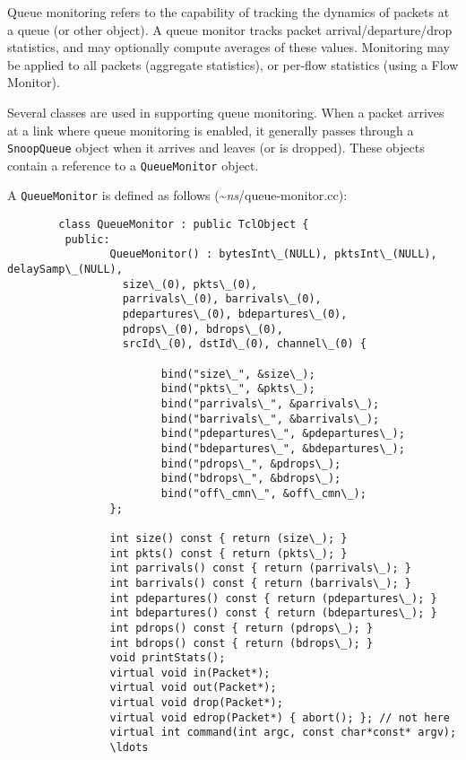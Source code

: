 Queue monitoring refers to the capability of tracking the
dynamics of packets at a queue (or other object).
A queue monitor tracks packet arrival/departure/drop statistics,
and may optionally compute averages of these values.
Monitoring may be applied to all packets (aggregate statistics), or
per-flow statistics (using a Flow Monitor).

Several classes are used in supporting queue monitoring.
When a packet arrives at a link where queue monitoring is enabled,
it generally passes through a {\tt SnoopQueue} object when it
arrives and leaves (or is dropped).
These objects contain a reference to a {\tt QueueMonitor} object.

A {\tt QueueMonitor} is defined as follows (\textasciitilde\emph{ns}/{queue-monitor.cc}):
\begin{verbatim}
        class QueueMonitor : public TclObject {
         public: 
                QueueMonitor() : bytesInt\_(NULL), pktsInt\_(NULL), delaySamp\_(NULL),
                  size\_(0), pkts\_(0),
                  parrivals\_(0), barrivals\_(0),
                  pdepartures\_(0), bdepartures\_(0),
                  pdrops\_(0), bdrops\_(0),
                  srcId\_(0), dstId\_(0), channel\_(0) {

                        bind("size\_", &size\_);
                        bind("pkts\_", &pkts\_);
                        bind("parrivals\_", &parrivals\_);
                        bind("barrivals\_", &barrivals\_);
                        bind("pdepartures\_", &pdepartures\_);
                        bind("bdepartures\_", &bdepartures\_);
                        bind("pdrops\_", &pdrops\_);
                        bind("bdrops\_", &bdrops\_);
                        bind("off\_cmn\_", &off\_cmn\_);
                };

                int size() const { return (size\_); }
                int pkts() const { return (pkts\_); }
                int parrivals() const { return (parrivals\_); }
                int barrivals() const { return (barrivals\_); }
                int pdepartures() const { return (pdepartures\_); }
                int bdepartures() const { return (bdepartures\_); }
                int pdrops() const { return (pdrops\_); }
                int bdrops() const { return (bdrops\_); }
                void printStats();
                virtual void in(Packet*);
                virtual void out(Packet*);
                virtual void drop(Packet*);
                virtual void edrop(Packet*) { abort(); }; // not here
                virtual int command(int argc, const char*const* argv);
                \ldots


\end{verbatim}
